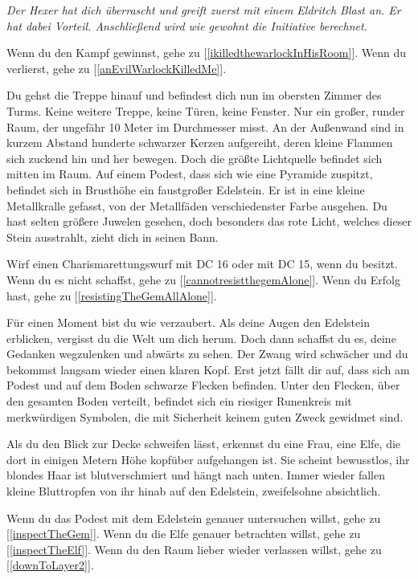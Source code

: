 \textit{Der Hexer hat dich überrascht und greift zuerst mit einem Eldritch Blast an. Er hat dabei Vorteil. Anschließend wird wie gewohnt die Initiative berechnet.}

\monsterWarlock

Wenn du den Kampf gewinnst, gehe zu [\ref{ikilledthewarlockInHisRoom}].
Wenn du verlierst, gehe zu [\ref{anEvilWarlockKilledMe}].


Du gehst die Treppe hinauf und befindest dich nun im obersten Zimmer des Turms. Keine weitere Treppe, keine Türen, keine Fenster. Nur ein großer, runder Raum, der ungefähr 10 Meter im Durchmesser misst. An der Außenwand sind in kurzem Abstand hunderte schwarzer Kerzen aufgereiht, deren kleine Flammen sich zuckend hin und her bewegen.
Doch die größte Lichtquelle befindet sich mitten im Raum. Auf einem Podest, dass sich wie eine Pyramide zuspitzt, befindet sich in Brusthöhe ein faustgroßer Edelstein. Er ist in eine kleine Metallkralle gefasst, von der Metallfäden verschiedenster Farbe ausgehen. Du hast selten größere Juwelen gesehen, doch besonders das rote Licht, welches dieser Stein ausstrahlt, zieht dich in seinen Bann.

Wirf einen Charismarettungswurf mit DC 16 oder mit DC 15, wenn du  besitzt. Wenn du es nicht schaffst, gehe zu [\ref{cannotresistthegemAlone}]. Wenn du Erfolg hast, gehe zu [\ref{resistingTheGemAllAlone}].


Für einen Moment bist du wie verzaubert. Als deine Augen den Edelstein erblicken, vergisst du die Welt um dich herum. Doch dann schaffst du es, deine Gedanken wegzulenken und abwärts zu sehen. Der Zwang wird schwächer und du bekommst langsam wieder einen klaren Kopf. Erst jetzt fällt dir auf, dass sich am Podest und auf dem Boden schwarze Flecken befinden. Unter den Flecken, über den gesamten Boden verteilt, befindet sich ein riesiger Runenkreis mit merkwürdigen Symbolen, die mit Sicherheit keinem guten Zweck gewidmet sind.

Als du den Blick zur Decke schweifen lässt, erkennst du eine Frau, eine Elfe, die dort in einigen Metern Höhe kopfüber aufgehangen ist. Sie scheint bewusstlos, ihr blondes Haar ist blutverschmiert und hängt nach unten. Immer wieder fallen kleine Bluttropfen von ihr hinab auf den Edelstein, zweifelsohne absichtlich.

Wenn du das Podest mit dem Edelstein genauer untersuchen willst, gehe zu [\ref{inspectTheGem}].
Wenn du die Elfe genauer betrachten willst, gehe zu [\ref{inspectTheElf}].
Wenn du den Raum lieber wieder verlassen willst, gehe zu [\ref{downToLayer2}].

